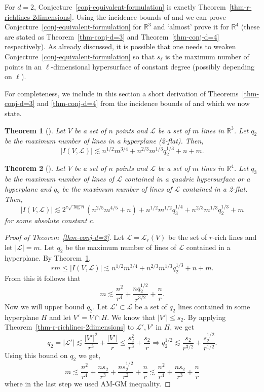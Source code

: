 \documentclass[11pt]{article}
\newtheorem{thm}{Theorem}[section]
\def\L{{\mathcal L}}
\def\R{{\mathbb{R}}}
\begin{document}
\begin{appendix}
For $d=2$, Conjecture~\ref{conj-equivalent-formulation} is exactly Theorem~\ref{thm-r-richlines-2dimensions}. Using the incidence bounds of \cite{GK10} and \cite{SS14} we can prove Conjecture~\ref{conj-equivalent-formulation} for $\R^3$ and `almost' prove it for $\R^4$ (these are stated as Theorem~\ref{thm-conj-d=3} and Theorem~\ref{thm-conj-d=4} respectively). As already discussed, it is possible that one needs to weaken  Conjecture~\ref{conj-equivalent-formulation} so that $s_\ell$ is the maximum number of points in an $\ell$-dimensional hypersurface of constant degree (possibly depending on $\ell$). 

For completeness, we include in this section a short derivation of Theorems~\ref{thm-conj-d=3} and \ref{thm-conj-d=4} from the incidence bounds of \cite{GK10} and \cite{SS14} which we now state.

\begin{thm}[\cite{GK10}]
\label{thm-incidencesinR3}
Let $V$ be a set of $n$ points and $\L$ be a set of $m$ lines in $\R^3$. Let $q_2$ be the maximum number of lines in a hyperplane (2-flat). Then,
$$|I(V,\L)|\lesssim n^{1/2}m^{3/4}+n^{2/3}m^{1/3}q_2^{1/3}+n+m.$$
\end{thm}

\begin{thm}[\cite{SS14}] 
\label{thm-incidencesinR4}
Let $V$ be a set of $n$ points and $\L$ be a set of $m$ lines in $\R^4$. Let $q_3$ be the maximum number of lines of $\L$ contained in a quadric hypersurface or a hyperplane and $q_2$ be the maximum number of lines of $\L$ contained in a 2-flat. Then,
$$|I(V,\L)|\lesssim 2^{c\sqrt{\log n}}\left(n^{2/5}m^{4/5}+n\right)+n^{1/2}m^{1/2}q_3^{1/4}+n^{2/3}m^{1/3}q_2^{1/3}+m$$ for some absolute constant $c$.
\end{thm}



\begin{proof}[Proof of Theorem~\ref{thm-conj-d=3}]
Let $\L=\L_r(V)$ be the set of $r$-rich lines and let $|\L|=m$. Let $q_2$ be the maximum number of lines of $\L$ contained in a hyperplane. By Theorem~\ref{thm-incidencesinR3}, $$rm\le |I(V,\L)|\lesssim n^{1/2}m^{3/4}+n^{2/3}m^{1/3}q_2^{1/3}+n+m.$$ From this it follows that
$$m \lesssim \frac{n^2}{r^4}+\frac{nq_2^{1/2}}{r^{3/2}}+\frac{n}{r}.$$
Now we will upper bound $q_2$. Let $\L'\subset \L$ be a set of $q_2$ lines contained in some hyperplane $H$ and let $V'=V\cap H$. We know that $|V'|\le s_2$. By applying Theorem~\ref{thm-r-richlines-2dimensions} to $\L',V'$ in $H$, we get $$q_2=|\L'|\lesssim \frac{|V'|^2}{r^3}+\frac{|V'|}{r} \le \frac{s_2^2}{r^3}+\frac{s_2}{r}\Rightarrow q_2^{1/2}\lesssim \frac{s_2}{r^{3/2}}+\frac{s_2^{1/2}}{r^{1/2}}.$$
Using this bound on $q_2$ we get, $$m\lesssim \frac{n^2}{r^4}+\frac{ns_2}{r^3}+\frac{ns_2^{1/2}}{r^2}+\frac{n}{r}\lesssim \frac{n^2}{r^4}+\frac{ns_2}{r^3}+\frac{n}{r}$$ where in the last step we used AM-GM inequality.
\end{proof}


\end{appendix}
\end{document}
